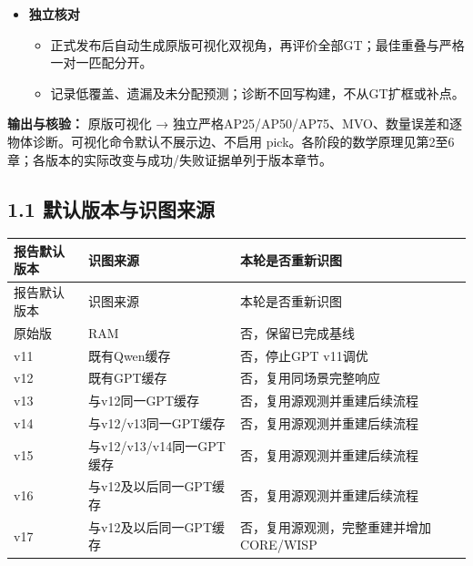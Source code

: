 \documentclass[UTF8,fontset=fandol]{ctexart}
\begin{document}
\begin{itemize}
\begin{itemize}
\begin{itemize}
\item \textbf{独立核对}


\begin{itemize}
\item 正式发布后自动生成原版可视化双视角，再评价全部GT；最佳重叠与严格一对一匹配分开。


\item 记录低覆盖、遗漏及未分配预测；诊断不回写构建，不从GT扩框或补点。

\end{itemize}
\end{itemize}
\end{itemize}
\end{itemize}


\textbf{输出与核验：} 原版可视化 → 独立严格AP25/AP50/AP75、MVO、数量误差和逐物体诊断。可视化命令默认不展示边、不启用 pick。各阶段的数学原理见第2至6章；各版本的实际改变与成功/失败证据单列于版本章节。



\subsection*{1.1 默认版本与识图来源}

{\small
\begin{longtable}{|p{}|p{}|p{}|}
\hline
报告默认版本 & 识图来源 & 本轮是否重新识图 \\ \hline
\endfirsthead
\hline
报告默认版本 & 识图来源 & 本轮是否重新识图 \\ \hline
\endhead
原始版 & RAM & 否，保留已完成基线 \\ \hline
v11 & 既有Qwen缓存 & 否，停止GPT v11调优 \\ \hline
v12 & 既有GPT缓存 & 否，复用同场景完整响应 \\ \hline
v13 & 与v12同一GPT缓存 & 否，复用源观测并重建后续流程 \\ \hline
v14 & 与v12/v13同一GPT缓存 & 否，复用源观测并重建后续流程 \\ \hline
v15 & 与v12/v13/v14同一GPT缓存 & 否，复用源观测并重建后续流程 \\ \hline
v16 & 与v12及以后同一GPT缓存 & 否，复用源观测并重建后续流程 \\ \hline
v17 & 与v12及以后同一GPT缓存 & 否，复用源观测，完整重建并增加CORE/WISP \\ \hline
\end{longtable}
}
\end{document}
